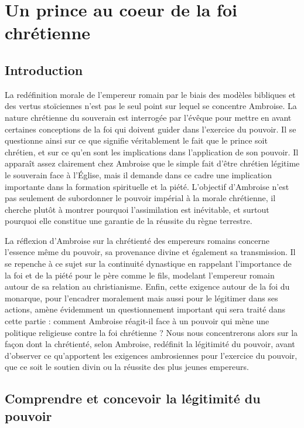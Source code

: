 \section{Un prince au coeur de la foi chrétienne}

\subsection*{Introduction}

La redéfinition morale de l'empereur romain par le biais des modèles bibliques et des vertus stoïciennes n'est pas le seul point sur lequel se concentre Ambroise. La nature chrétienne du souverain est interrogée par l'évêque pour mettre en avant certaines conceptions de la foi qui doivent guider dans l'exercice du pouvoir. Il se questionne ainsi sur ce que signifie véritablement le fait que le prince soit chrétien, et sur ce qu'en sont les implications dans l'application de son pouvoir. Il apparaît assez clairement chez Ambroise que le simple fait d'être chrétien légitime le souverain face à l'Église, mais il demande dans ce cadre une implication importante dans la formation spirituelle et la piété. L'objectif d'Ambroise n'est pas seulement de subordonner le pouvoir impérial à la morale chrétienne, il cherche plutôt à montrer pourquoi l'assimilation est inévitable, et surtout pourquoi elle constitue une garantie de la réussite du règne terrestre.

\bigskip

La réflexion d'Ambroise sur la chrétienté des empereurs romains concerne l'essence même du pouvoir, sa provenance divine et également sa transmission. Il se repenche à ce sujet sur la continuité dynastique en rappelant l'importance de la foi et de la piété pour le père comme le fils, modelant l'empereur romain autour de sa relation au christianisme. Enfin, cette exigence autour de la foi du monarque, pour l'encadrer moralement mais aussi pour le légitimer dans ses actions, amène évidemment un questionnement important qui sera traité dans cette partie : comment Ambroise réagit-il face à un pouvoir qui mène une politique religieuse contre la foi chrétienne ? Nous nous concentrerons alors sur la façon dont la chrétienté, selon Ambroise, redéfinit la légitimité du pouvoir, avant d'observer ce qu'apportent les exigences ambrosiennes pour l'exercice du pouvoir, que ce soit le soutien divin ou la réussite des plus jeunes empereurs.

\bigskip

\subsection{Comprendre et concevoir la légitimité du pouvoir}

